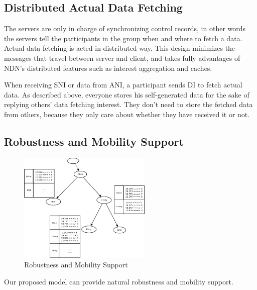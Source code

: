 \documentclass[conference]{IEEEtran}
\begin{document}
\subsection{Distributed Actual Data Fetching}
The servers are only in charge of synchronizing control records,
in other words the servers tell the participants in the group when and where to fetch a data.
Actual data fetching is acted in distributed way.
This design minimizes the messages that travel between server and client,
and takes fully advantages of NDN's distributed features such as interest aggregation and caches.

When receiving SNI or data from ANI,
a participant sends DI to fetch actual data.
As described above, everyone stores his self-generated data for the sake of replying others' data fetching interest.
They don't need to store the fetched data from others,
because they only care about whether they have received it or not.

\subsection{Robustness and Mobility Support}
\label{mobility}
\begin{figure}[!t]
\centering
\includegraphics[width=2.5in]{../png/mobility.png}
\caption{Robustness and Mobility Support}
\label{mobility_pic}
\end{figure}
Our proposed model can provide natural robustness and mobility support.
\end{document}
